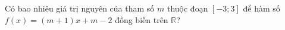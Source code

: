 \begin{ex}
Có bao nhiêu giá trị nguyên của tham số $m$ thuộc đoạn $[-3;3]$ để hàm số $f(x)=(m+1)x+m-2$ đồng biến trên $\mathbb R$?
\end{ex}
